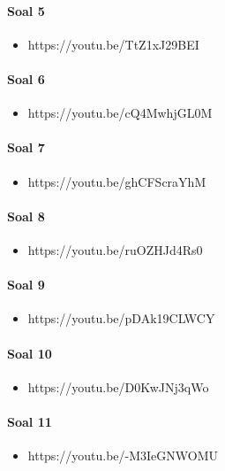 \documentclass{article}
\begin{document}
        \paragraph{Soal 5}
            \begin{itemize}
                \item https://youtu.be/TtZ1xJ29BEI
            \end{itemize}
        
        \paragraph{Soal 6}
            \begin{itemize}
                \item https://youtu.be/cQ4MwhjGL0M
            \end{itemize}
        
        \paragraph{Soal 7}
            \begin{itemize}
                \item https://youtu.be/ghCFScraYhM
            \end{itemize}
        
        \paragraph{Soal 8}
            \begin{itemize}
                \item https://youtu.be/ruOZHJd4Rs0
            \end{itemize}
        
        \paragraph{Soal 9}
            \begin{itemize}
                \item https://youtu.be/pDAk19CLWCY
            \end{itemize}
        
        \paragraph{Soal 10}
            \begin{itemize}
                \item https://youtu.be/D0KwJNj3qWo
            \end{itemize}
                          
        \paragraph{Soal 11}
            \begin{itemize}
                \item https://youtu.be/-M3IeGNWOMU
            \end{itemize}
                                
\end{document}
